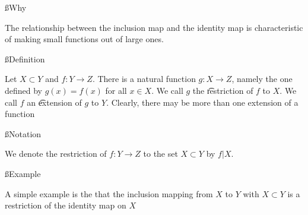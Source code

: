
\ss{Why}

The relationship between the inclusion map and the identity map is characteristic of making small functions out of large ones.

\ss{Definition}

Let $X \subset Y$ and $f: Y \to Z$.
There is a natural function $g: X \to Z$, namely the one defined by $g(x) = f(x)$ for all $x \in X$.
We call $g$ the \t{restriction} of $f$ to $X$.
We call $f$ an \t{extension} of $g$ to $Y$.
Clearly, there may be more than one extension of a function

\ss{Notation}

We denote the restriction of $f: Y \to Z$ to the set $X \subset Y$ by $f|X$.

\ss{Example}

A simple example is the that the inclusion mapping from $X$ to $Y$ with $X \subset Y$ is a restriction of the identity map on $X$

\blankpage

